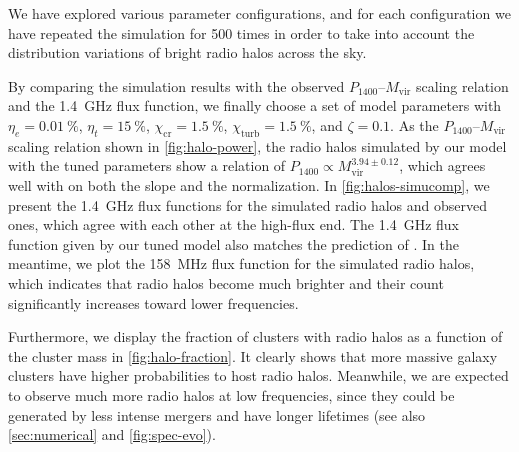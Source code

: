 \documentclass[twocolumn]{aastex62}
\newcommand{\R}[1]{\mathrm{#1}}
\newcommand{\editone}[1]{{\leavevmode\color{cyan}#1}}
\begin{document}
We have explored various parameter configurations,
and for each configuration we have repeated the simulation for 500 times
in order to take into account the distribution variations of bright
radio halos across the sky.
\editone{%
By comparing the simulation results with the observed
$P_{1400}$--$M_{\R{vir}}$ scaling relation and the \SI{1.4}{\GHz} flux
function, we finally choose a set of model parameters with
$\eta_e = \SI{0.01}{\percent}$,
$\eta_t = \SI{15}{\percent}$,
$\chi_{\R{cr}} = \SI{1.5}{\percent}$,
$\chi_{\R{turb}} = \SI{1.5}{\percent}$,
and $\zeta = 0.1$.
As the $P_{1400}$--$M_{\R{vir}}$ scaling relation shown in
\autoref{fig:halo-power}, the radio halos simulated by our model with the
tuned parameters show a relation of
$P_{1400} \propto M_{\R{vir}}^{3.94 \pm 0.12}$, which agrees well with
\citet{cassano2013} on both the slope and the normalization.
In \autoref{fig:halos-simucomp}, we present the \SI{1.4}{\GHz} flux
functions for the simulated radio halos and observed ones, which agree with
each other at the high-flux end.
The \SI{1.4}{\GHz} flux function given by our tuned model also matches
the prediction of \citet{cassano2012}.
In the meantime, we plot the \SI{158}{\MHz} flux function for the simulated
radio halos, which indicates that radio halos become much brighter and
their count significantly increases toward lower frequencies.

Furthermore, we display the fraction of clusters with radio halos as a
function of the cluster mass in \autoref{fig:halo-fraction}.
It clearly shows that more massive galaxy clusters have higher
probabilities to host radio halos.
Meanwhile, we are expected to observe much more radio halos at low
frequencies, since they could be generated by less intense mergers and have
longer lifetimes
(see also \autoref{sec:numerical} and \autoref{fig:spec-evo}).
}
\end{document}
